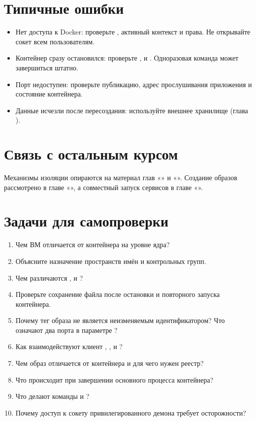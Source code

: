\begin{samepage}
\section{Типичные ошибки}
\begin{itemize}[nosep]
  \item Нет доступа к Docker: проверьте , активный контекст и права. Не открывайте сокет всем пользователям.
  \item Контейнер сразу остановился: проверьте ,  и . Одноразовая команда может завершиться штатно.
  \item Порт недоступен: проверьте публикацию, адрес прослушивания приложения и состояние контейнера.
  \item Данные исчезли после пересоздания: используйте внешнее хранилище (глава ).
\end{itemize}

\section{Связь с остальным курсом}

Механизмы изоляции опираются на материал глав «» и «». Создание образов рассмотрено в главе «», а совместный запуск сервисов в главе «».

\section{Задачи для самопроверки}
\begin{enumerate}[nosep]
  \item Чем ВМ отличается от контейнера на уровне ядра?
  \item Объясните назначение пространств имён и контрольных групп.
  \item Чем различаются ,  и ?
  \item Проверьте сохранение файла после остановки и повторного запуска контейнера.
  \item Почему тег образа не является неизменяемым идентификатором? Что означают два порта в параметре ?
  \item Как взаимодействуют клиент , ,  и ?
  \item Чем образ отличается от контейнера и для чего нужен реестр?
  \item Что происходит при завершении основного процесса контейнера?
  \item Что делают команды  и ?
  \item Почему доступ к сокету привилегированного демона требует осторожности?
\end{enumerate}
\end{samepage}
\par
\clearpage
\endgroup